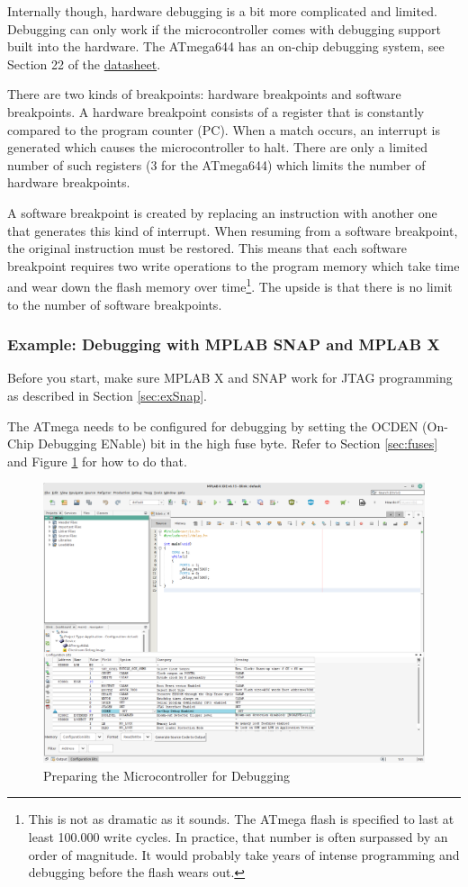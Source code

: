 \documentclass{article}
\newcommand{\datasheet}{\href{https://ww1.microchip.com/downloads/en/DeviceDoc/doc2593.pdf}{datasheet}}
\begin{document}
Internally though, hardware debugging is a bit more complicated and limited. Debugging can only work if the microcontroller comes with debugging support built into the hardware. The ATmega644 has an on-chip debugging system, see Section 22 of the \datasheet. 

There are two kinds of breakpoints: hardware breakpoints and software breakpoints. A hardware breakpoint consists of a register that is constantly compared to the program counter (PC). When a match occurs, an interrupt is generated which causes the microcontroller to halt. There are only a limited number of such registers (3 for the ATmega644) which limits the number of hardware breakpoints. 

A software breakpoint is created by replacing an instruction with another one that generates this kind of interrupt. When resuming from a software breakpoint, the original instruction must be restored. This means that each software breakpoint requires two write operations to the program memory which take time and wear down the flash memory over time\footnote{This is not as dramatic as it sounds. The ATmega flash is specified to last at least 100.000 write cycles. In practice, that number is often surpassed by an order of magnitude. It would probably take years of intense programming and debugging before the flash wears out.}. The upside is that there is no limit to the number of software breakpoints. 

\subsubsection{Example: Debugging with MPLAB SNAP and MPLAB X}
Before you start, make sure MPLAB X and SNAP work for JTAG programming as described in Section \ref{sec:exSnap}. 

The ATmega needs to be configured for debugging by setting the OCDEN (On-Chip Debugging ENable) bit in the high fuse byte. Refer to Section \ref{sec:fuses} and Figure \ref{fig:debugMplabX1} for how to do that. 

\begin{figure}[htb]
\centering
\includegraphics[width=\textwidth]{Pictures/DebugMPLABX1.png}
\caption{Preparing the Microcontroller for Debugging}
\label{fig:debugMplabX1}
\end{figure}
\end{document}
